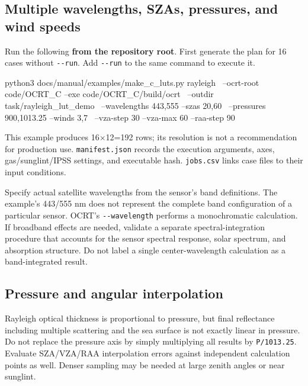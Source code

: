 \subsection{Multiple wavelengths, SZAs, pressures, and wind speeds}
\label{sec:auto:04_examples:3.3}
Run the following \textbf{from the repository root}. First generate the plan for 16 cases without \texttt{-\allowbreak{}-\allowbreak{}run}. Add \texttt{-\allowbreak{}-\allowbreak{}run} to the same command to execute it.


\par\noindent\begin{minipage}{\linewidth}
\begin{ManualCode}
python3 docs/manual/examples/make_c_luts.py rayleigh \
  --ocrt-root code/OCRT_C --exe code/OCRT_C/build/ocrt \
  --outdir task/rayleigh_lut_demo \
  --wavelengths 443,555 --szas 20,60 \
  --pressures 900,1013.25 --winds 3,7 \
  --vza-step 30 --vza-max 60 --raa-step 90
\end{ManualCode}
\end{minipage}\par

This example produces 16\ensuremath{\times}12=192 rows; its resolution is not a recommendation for production use. \texttt{manifest.\allowbreak{}json} records the execution arguments, axes, gas/sunglint/IPSS settings, and executable hash. \texttt{jobs.\allowbreak{}csv} links case files to their input conditions.

Specify actual satellite wavelengths from the sensor's band definitions. The example's 443/555 nm does not represent the complete band configuration of a particular sensor. OCRT's \texttt{-\allowbreak{}-\allowbreak{}wavelength} performs a monochromatic calculation. If broadband effects are needed, validate a separate spectral-integration procedure that accounts for the sensor spectral response, solar spectrum, and absorption structure. Do not label a single center-wavelength calculation as a band-integrated result.

\subsection{Pressure and angular interpolation}
\label{sec:auto:04_examples:3.4}
Rayleigh optical thickness is proportional to pressure, but final reflectance including multiple scattering and the sea surface is not exactly linear in pressure. Do not replace the pressure axis by simply multiplying all results by \texttt{P/\allowbreak{}1013.\allowbreak{}25}. Evaluate SZA/VZA/RAA interpolation errors against independent calculation points as well. Denser sampling may be needed at large zenith angles or near sunglint.

